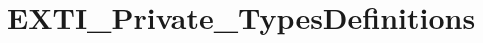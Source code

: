 \hypertarget{group___e_x_t_i___private___types_definitions}{\section{E\-X\-T\-I\-\_\-\-Private\-\_\-\-Types\-Definitions}
\label{group___e_x_t_i___private___types_definitions}
}

